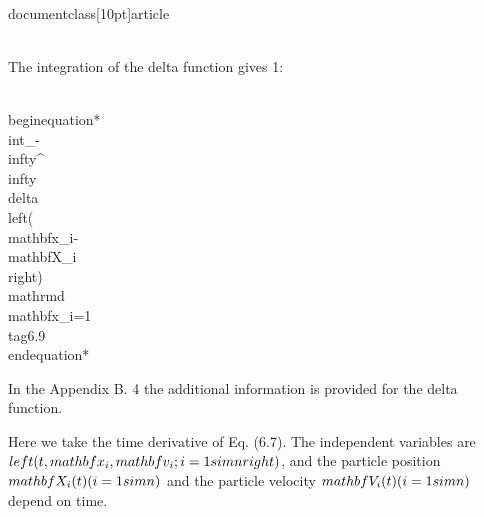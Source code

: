 \\documentclass[10pt]{article}
\begin{document}
{{{{\\[
\\delta\\left(\\mathbf{x}_{i}-\\mathbf{X}_{i}\\right)=\\left\\{\\begin{array}{cc}
\\infty, & \\mathbf{x}_{i}=\\mathbf{X}_{i}  \\tag{6.8}\\\\
0, & \\mathbf{x}_{i} \\neq \\mathbf{X}_{i}
\\end{array}\\right\\}=\\delta\\left(\\mathbf{X}_{i}-\\mathbf{x}_{i}\\right)
\\]

The integration of the delta function gives 1:


\\begin{equation*}
\\int_{-\\infty}^{\\infty} \\delta\\left(\\mathbf{x}_{i}-\\mathbf{X}_{i}\\right) \\mathrm{d} \\mathbf{x}_{i}=1 \\tag{6.9}
\\end{equation*}


In the Appendix B. 4 the additional information is provided for the delta function.

Here we take the time derivative of Eq. (6.7). The independent variables are $\\left(t, \\mathbf{x}_{i}, \\mathbf{v}_{i} ; i=1 \\sim n\\right)$, and the particle position $\\mathbf{X}_{i}(t)(i=1 \\sim n)$ and the particle velocity $\\mathbf{V}_{i}(t)(i=1 \\sim n)$ depend on time.


}}}}
\end{document}

